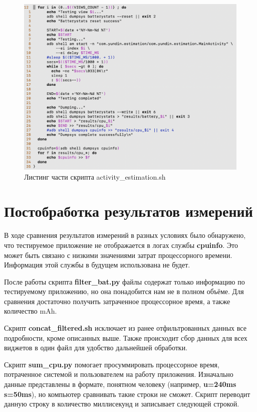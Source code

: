 \documentclass[a4paper,14pt]{extarticle} %
\begin{document}
	\begin{figure}[tbh]
		\includegraphics[width=\textwidth]{activity_estimation}
		\caption{Листинг части скрипта activity\_estimation.sh}
		\label{fig:activity_estimation}
	\end{figure}

	\clearpage
	\section{Постобработка результатов измерений}
	
	В ходе сравнения результатов измерений в разных условиях было обнаружено, что тестируемое приложение не отображается в логах службы \textbf{cpuinfo}. Это может быть связано с низкими значениями затрат процессорного времени. Информация этой службы в будущем использована не будет.
	
	После работы скрипта \textbf{filter\_bat.py} файлы содержат только информацию по тестируемому приложению, но она понадобится нам не в полном объёме. Для сравнения достаточно получить затраченное процессорное время, а также количество mAh.
	
	Скрипт \textbf{concat\_filtered.sh} исключает из ранее отфильтрованных данных все подробности, кроме описанных выше. Также происходит сбор данных для всех виджетов в один файл для удобство дальнейшей обработки.
	
	Скрипт \textbf{sum\_cpu.py} помогает просуммировать процессорное время, потраченное системой и пользователем на работу приложения. Изначально данные представлены в формате, понятном человеку (например, \textbf{u=240ms s=50ms}), но компьютер сравнивать такие строки не сможет. Скрипт переводит данную строку в количество миллисекунд и записывает следующей строкой.
\end{document}
